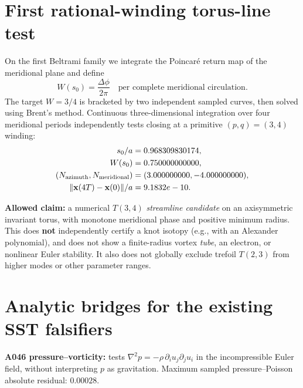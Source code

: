 \documentclass[10pt,a4paper]{article}
\begin{document}
\section{First rational-winding torus-line test}
On the first Beltrami family we integrate the Poincar\'e return map of the meridional plane and define
\begin{equation}
W(s_0)=\frac{\Delta\phi}{2\pi}\quad\text{per complete meridional circulation}.
\end{equation}
The target $W=3/4$ is bracketed by two independent sampled curves, then solved using Brent's method. Continuous three-dimensional integration over four meridional periods independently tests closing at a primitive $(p,q)=(3,4)$ winding:
\begin{align}
s_0/a&=0.968309830174,\\
W(s_0)&=0.750000000000,\\
(N_{\rm azimuth},N_{\rm meridional})&=(3.000000000,-4.000000000),\\
\|\mathbf x(4T)-\mathbf x(0)\|/a&=9.1832e-10.
\end{align}
\begin{center}
\end{center}
\textbf{Allowed claim:} a numerical $T(3,4)$ \emph{streamline candidate} on an axisymmetric invariant torus, with monotone meridional phase and positive minimum radius. This does \textbf{not} independently certify a knot isotopy (e.g., with an Alexander polynomial), and does not show a finite-radius vortex \emph{tube}, an electron, or nonlinear Euler stability. It also does not globally exclude trefoil $T(2,3)$ from higher modes or other parameter ranges.

\section{Analytic bridges for the existing SST falsifiers}
\textbf{A046 pressure--vorticity:} tests $\nabla^2p=-\rho\,\partial_i u_j\partial_j u_i$ in the incompressible Euler field, without interpreting $p$ as gravitation. Maximum sampled pressure--Poisson absolute residual: $0.00028$.
\end{document}
